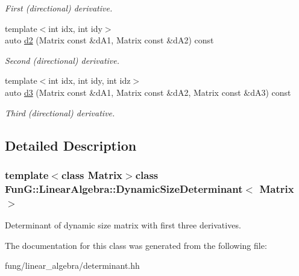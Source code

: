 \begin{DoxyCompactItemize}
\begin{DoxyCompactList}\small\item\em First (directional) derivative. \end{DoxyCompactList}\item 
\hypertarget{classFunG_1_1LinearAlgebra_1_1DynamicSizeDeterminant_a012fc1b7e116b65af25bf7985cecfcc1}{{\footnotesize template$<$int idx, int idy$>$ }\\auto \hyperlink{classFunG_1_1LinearAlgebra_1_1DynamicSizeDeterminant_a012fc1b7e116b65af25bf7985cecfcc1}{d2} (Matrix const \&d\-A1, Matrix const \&d\-A2) const }\label{classFunG_1_1LinearAlgebra_1_1DynamicSizeDeterminant_a012fc1b7e116b65af25bf7985cecfcc1}

\begin{DoxyCompactList}\small\item\em Second (directional) derivative. \end{DoxyCompactList}\item 
\hypertarget{classFunG_1_1LinearAlgebra_1_1DynamicSizeDeterminant_a9cadc3d8e2332f153f3f7e9c93232333}{{\footnotesize template$<$int idx, int idy, int idz$>$ }\\auto \hyperlink{classFunG_1_1LinearAlgebra_1_1DynamicSizeDeterminant_a9cadc3d8e2332f153f3f7e9c93232333}{d3} (Matrix const \&d\-A1, Matrix const \&d\-A2, Matrix const \&d\-A3) const }\label{classFunG_1_1LinearAlgebra_1_1DynamicSizeDeterminant_a9cadc3d8e2332f153f3f7e9c93232333}

\begin{DoxyCompactList}\small\item\em Third (directional) derivative. \end{DoxyCompactList}\end{DoxyCompactItemize}


\subsection{Detailed Description}
\subsubsection*{template$<$class Matrix$>$class Fun\-G\-::\-Linear\-Algebra\-::\-Dynamic\-Size\-Determinant$<$ Matrix $>$}

Determinant of dynamic size matrix with first three derivatives. 

The documentation for this class was generated from the following file\-:\begin{DoxyCompactItemize}
\item 
fung/linear\-\_\-algebra/determinant.\-hh\end{DoxyCompactItemize}
